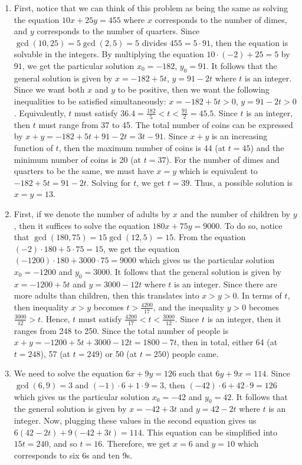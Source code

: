 \begin{solution}
    \begin{enumerate}
        \item First, notice that we can think of this problem as being the same as solving the equation $10x + 25y = 455$ where $x$ corresponds to the number of dimes, and $y$ corresponds to the number of quarters. Since $\gcd(10, 25) = 5\gcd(2, 5) = 5$ divides $455 = 5\cdot 91$, then the equation is solvable in the integers. By multiplying the equation $10\cdot(-2) + 25 = 5$ by $91$, we get the particular solution $x_0 = -182$, $y_0 = 91$. It follows that the general solution is given by $x = -182 + 5t$, $y = 91 - 2t$ where $t$ is an integer. Since we want both $x$ and $y$ to be positive, then we want the following inequalities to be satisfied simultaneously: $x = -182 + 5t > 0$, $y = 91 - 2t > 0$. Equivalently, $t$ must satisfy $36.4 = \frac{182}{5} < t < \frac{91}{2} = 45.5$. Since $t$ is an integer, then $t$ must range from 37 to 45. The total number of coins can be expressed by $x + y = -182 + 5t + 91 - 2t = 3t - 91$. Since $x + y$ is an increasing function of $t$, then the maximum number of coins is 44 (at $t = 45$) and the minimum number of coins is 20 (at $t = 37$). For the number of dimes and quarters to be the same, we must have 
        $x = y$ which is equivalent to $-182 + 5t = 91 - 2t$. Solving for $t$, we get $t = 39$. Thus, a possible solution is $x = y = 13$.
        \item First, if we denote the number of adults by $x$ and the number of children by $y$, then it suffices to solve the equation $180x + 75y = 9000$. To do so, notice that $\gcd(180, 75) = 15\gcd(12, 5) = 15$. From the equation $(-2)\cdot 180 + 5\cdot 75 = 15$, we get the equation $(-1200)\cdot 180 + 3000\cdot 75 = 9000$ which gives us the particular solution $x_0 = -1200$ and $y_0 = 3000$. It follows that the general solution is given by $x = -1200 + 5t$ and $y = 3000 - 12t$ where $t$ is an integer. Since there are more adults than children, then this translates into $x > y > 0$. In terms of $t$, then inequality $x > y$ becomes $t > \frac{4200}{17}$, and the inequality $y > 0$ becomes $\frac{3000}{12}>t$. Hence, $t$ must satisfy $\frac{4200}{17} < t < \frac{3000}{12}$. Since $t$ is an integer, then it ranges from 248 to 250. Since the total number of people is $x + y = -1200 + 5t + 3000 - 12t = 1800 - 7t$, then in total, either 64 (at $t = 248$), 57 (at $t = 249$) or 50 (at $t = 250$) people came.
        \item We need to solve the equation $6x + 9y = 126$ such that $6y + 9x = 114$. Since $\gcd(6, 9) = 3$ and $(-1)\cdot 6 + 1\cdot 9 = 3$, then $(-42)\cdot 6 + 42\cdot 9 = 126$ which gives us the particular solution $x_0 = -42$ and $y_0 = 42$. It follows that the general solution is given by $x = -42 + 3t$ and $y = 42 - 2t$ where $t$ is an integer. Now, plugging these values in the second equation gives us $6(42 - 2t) + 9(-42 + 3t) = 114$. This equation can be simplified into $15t = 240$, and so $t = 16$. Therefore, we get $x = 6$ and $y = 10$ which corresponds to six 6s and ten 9s.
    \end{enumerate}
\end{solution}

